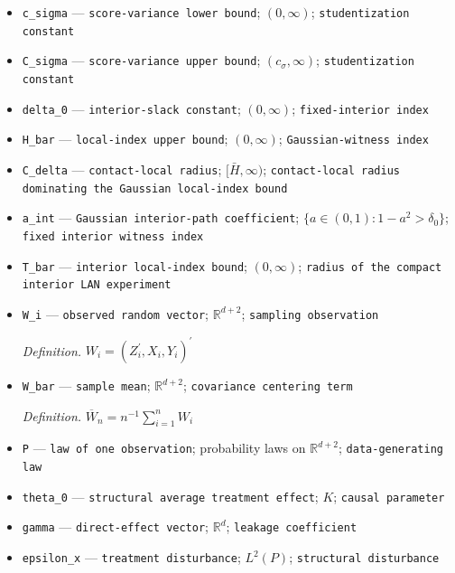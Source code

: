 \documentclass{article}
\begin{document}
\begin{itemize}
  \item \texttt{c\_\allowbreak{}sigma} --- \texttt{score-\allowbreak{}variance lower bound}; \((0,\infty)\); \texttt{studentization constant}
  \item \texttt{C\_\allowbreak{}sigma} --- \texttt{score-\allowbreak{}variance upper bound}; \((c_{\sigma},\infty)\); \texttt{studentization constant}
  \item \texttt{delta\_\allowbreak{}0} --- \texttt{interior-\allowbreak{}slack constant}; \((0,\infty)\); \texttt{fixed-\allowbreak{}interior index}
  \item \texttt{H\_\allowbreak{}bar} --- \texttt{local-\allowbreak{}index upper bound}; \((0,\infty)\); \texttt{Gaussian-\allowbreak{}witness index}
  \item \texttt{C\_\allowbreak{}delta} --- \texttt{contact-\allowbreak{}local radius}; \([\bar H,\infty)\); \texttt{contact-\allowbreak{}local radius dominating the Gaussian local-\allowbreak{}index bound}
  \item \texttt{a\_\allowbreak{}int} --- \texttt{Gaussian interior-\allowbreak{}path coefficient}; \(\{a\in(0,1):1-a^2>\delta_0\}\); \texttt{fixed interior witness index}
  \item \texttt{T\_\allowbreak{}bar} --- \texttt{interior local-\allowbreak{}index bound}; \((0,\infty)\); \texttt{radius of the compact interior LAN experiment}
  \item \texttt{W\_\allowbreak{}i} --- \texttt{observed random vector}; \(\mathbb R^{d+2}\); \texttt{sampling observation}
  \par\smallskip\noindent\emph{Definition.} \(W_i=(Z_i^{\prime},X_i,Y_i)^{\prime}\)
  \item \texttt{W\_\allowbreak{}bar} --- \texttt{sample mean}; \(\mathbb R^{d+2}\); \texttt{covariance centering term}
  \par\smallskip\noindent\emph{Definition.} \(\overline W_n=n^{-1}\sum_{i=1}^nW_i\)
  \item \texttt{P} --- \texttt{law of one observation}; probability laws on \(\mathbb R^{d+2}\); \texttt{data-\allowbreak{}generating law}
  \item \texttt{theta\_\allowbreak{}0} --- \texttt{structural average treatment effect}; \(K\); \texttt{causal parameter}
  \item \texttt{gamma} --- \texttt{direct-\allowbreak{}effect vector}; \(\mathbb R^d\); \texttt{leakage coefficient}
  \item \texttt{epsilon\_\allowbreak{}x} --- \texttt{treatment disturbance}; \(L^2(P)\); \texttt{structural disturbance}

\end{itemize}
\end{document}

